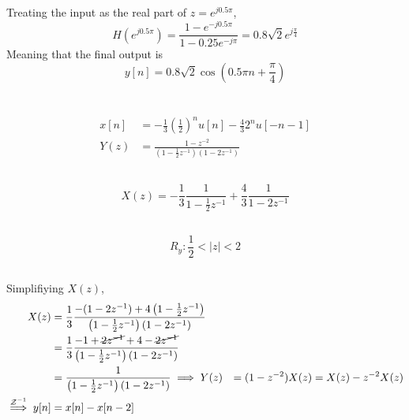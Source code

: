 \documentclass{article}
\begin{document}
\subsection{}

Treating the input as the real part of \(z = e^{j 0.5 \pi}\),
\begin{equation}
    H(e^{j 0.5 \pi}) = \frac{1 - e^{-j 0.5 \pi}}{1 - 0.25e^{-j\pi}} = 0.8 \sqrt{2} e^{j \frac{\pi}{4}}
\end{equation}
Meaning that the final output is
\begin{equation}
    y[n] = 0.8 \sqrt{2} \cos\left(0.5 \pi n + \frac{\pi}{4}\right)
\end{equation}

\section{}

\begin{align}
    x[n] &= -\frac{1}{3} \left(\frac{1}{2}\right)^n u[n] - \frac{4}{3} 2^n u[-n - 1] \\
    Y(z) &= \frac{1 - z^{-2}}{\left(1 - \frac{1}{2} z^{-1}\right) (1 - 2z^{-1})}
\end{align}

\subsection{}

\begin{equation}
    X(z) = -\frac{1}{3} \frac{1}{1 - \frac{1}{2} z^{-1}} + \frac{4}{3} \frac{1}{1 - 2z^{-1}}
\end{equation}

\subsection{}

\begin{equation}
    R_y: \frac{1}{2} < |z| < 2
\end{equation}

\subsection{}

Simplifiying \(X(z)\),
\begin{align}
    X(z) &= \frac{1}{3} \frac{-(1 - 2z^{-1}) + 4 \left(1 - \frac{1}{2} z^{-1}\right)}{\left(1 - \frac{1}{2} z^{-1}\right) (1 - 2z^{-1})} \\
    &= \frac{1}{3} \frac{-1 + \cancel{2z^{-1}} + 4 - \cancel{2z^{-1}}}{\left(1 - \frac{1}{2} z^{-1}\right) (1 - 2z^{-1})} \\
    &= \frac{1}{\left(1 - \frac{1}{2} z^{-1}\right) (1 - 2z^{-1})}
    \implies Y(z) &= (1 - z^{-2}) X(z) = X(z) - z^{-2} X(z) \\
    \overset{\mathcal{Z}^{-1}}{\implies} y[n] &= x[n] - x[n - 2]
\end{align}
\end{document}
